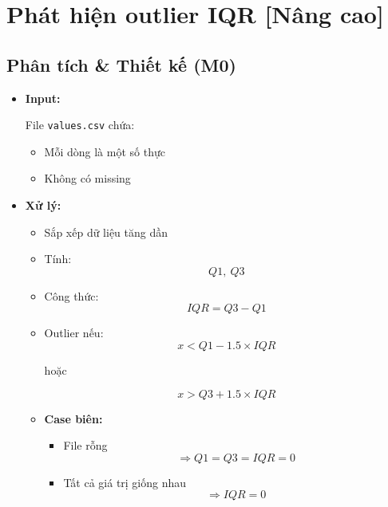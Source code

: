 \section{Phát hiện outlier IQR [Nâng cao]}
\subsection{Phân tích \& Thiết kế (M0)}

\begin{itemize}

    \item \textbf{Input:}

    File \texttt{values.csv} chứa:

    \begin{itemize}
        \item Mỗi dòng là một số thực
        \item Không có missing
    \end{itemize}

    \item \textbf{Xử lý:}

    \begin{itemize}

        \item Sắp xếp dữ liệu tăng dần

        \item Tính:
        \[
            Q1,\ Q3
        \]

        \item Công thức:
        \[
            IQR = Q3 - Q1
        \]

        \item Outlier nếu:
        \[
            x < Q1 - 1.5 \times IQR
        \]

        hoặc

        \[
            x > Q3 + 1.5 \times IQR
        \]

    \end{itemize}

    \begin{itemize}

        \item \textbf{Case biên:}

        \begin{itemize}
            \item File rỗng
            \[
                \Rightarrow
                Q1=Q3=IQR=0
            \]

            \item Tất cả giá trị giống nhau
            \[
                \Rightarrow IQR=0
            \]


\end{itemize}
\end{itemize}
\end{itemize}
